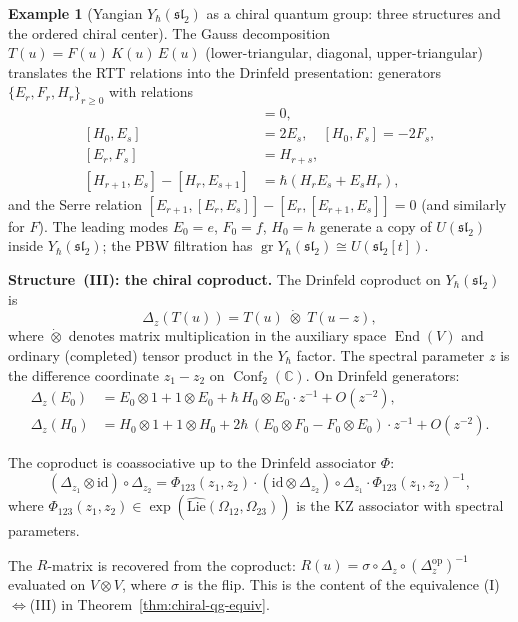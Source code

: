 \documentclass[11pt,reqno]{amsart}
\theoremstyle{definition}
\newtheorem{example}[theorem]{Example}
\theoremstyle{remark}
\newcommand{\Lie}{\mathrm{Lie}}
\DeclareMathOperator{\End}{End}
\DeclareMathOperator{\Conf}{Conf}
\newcommand{\CC}{\mathbb{C}}
\newcommand{\id}{\mathrm{id}}
\newcommand{\op}{\mathrm{op}}
\numberwithin{equation}{section}
\begin{document}
\begin{example}[Yangian $Y_\hbar(\mathfrak{sl}_2)$
as a chiral quantum group: three structures and the
ordered chiral center]
The Gauss decomposition
$T(u) = F(u)\,K(u)\,E(u)$ (lower-triangular, diagonal,
upper-triangular) translates the RTT relations into
the Drinfeld presentation: generators
$\{E_r, F_r, H_r\}_{r \geq 0}$ with relations
\begin{align}
  [H_r, H_s] &= 0, \label{eq:yangian-D1}\\
  [H_0, E_s] &= 2E_s, \quad [H_0, F_s] = -2F_s,
  \label{eq:yangian-D2}\\
  [E_r, F_s] &= H_{r+s}, \label{eq:yangian-D4}\\
  [H_{r+1}, E_s] - [H_r, E_{s+1}]
  &= \hbar(H_r E_s + E_s H_r),
  \label{eq:yangian-D5}
\end{align}
and the Serre relation
$[E_{r+1}, [E_r, E_s]] - [E_r, [E_{r+1}, E_s]] = 0$
(and similarly for $F$). The leading modes $E_0 = e$,
$F_0 = f$, $H_0 = h$ generate a copy of
$U(\mathfrak{sl}_2)$ inside $Y_\hbar(\mathfrak{sl}_2)$;
the PBW filtration has
$\operatorname{gr} Y_\hbar(\mathfrak{sl}_2)
\cong U(\mathfrak{sl}_2[t])$.

\medskip
\noindent
\textbf{Structure~(III): the chiral coproduct.}
The Drinfeld coproduct on $Y_\hbar(\mathfrak{sl}_2)$ is
\begin{equation}\label{eq:yangian-drinfeld-coprod}
  \Delta_z(T(u))
  = T(u) \;\dot{\otimes}\; T(u - z),
\end{equation}
where $\dot{\otimes}$ denotes matrix multiplication in the
auxiliary space $\End(V)$ and ordinary (completed) tensor
product in the $Y_\hbar$ factor. The spectral parameter $z$
is the difference coordinate $z_1 - z_2$ on $\Conf_2(\CC)$.
On Drinfeld generators:
\begin{align}
  \Delta_z(E_0) &= E_0 \otimes 1
  + 1 \otimes E_0
  + \hbar\,H_0 \otimes E_0 \cdot z^{-1}
  + O(z^{-2}), \label{eq:yangian-coprod-E}\\
  \Delta_z(H_0) &= H_0 \otimes 1
  + 1 \otimes H_0
  + 2\hbar\,(E_0 \otimes F_0
  - F_0 \otimes E_0) \cdot z^{-1}
  + O(z^{-2}).
  \label{eq:yangian-coprod-H}
\end{align}

The coproduct is coassociative up to the Drinfeld
associator $\Phi$:
\[
  (\Delta_{z_1} \otimes \id) \circ \Delta_{z_2}
  = \Phi_{123}(z_1, z_2) \cdot
  (\id \otimes \Delta_{z_2}) \circ \Delta_{z_1}
  \cdot \Phi_{123}(z_1, z_2)^{-1},
\]
where $\Phi_{123}(z_1, z_2) \in
\exp(\widehat{\Lie}(\Omega_{12}, \Omega_{23}))$ is
the KZ associator with spectral parameters.

The $R$-matrix is recovered from the coproduct:
$R(u) = \sigma \circ \Delta_z \circ (\Delta_z^{\op})^{-1}$
evaluated on $V \otimes V$, where $\sigma$ is the flip.
This is the content of the equivalence
(I)$\Leftrightarrow$(III) in
Theorem~\ref{thm:chiral-qg-equiv}.


\end{example}
\end{document}
